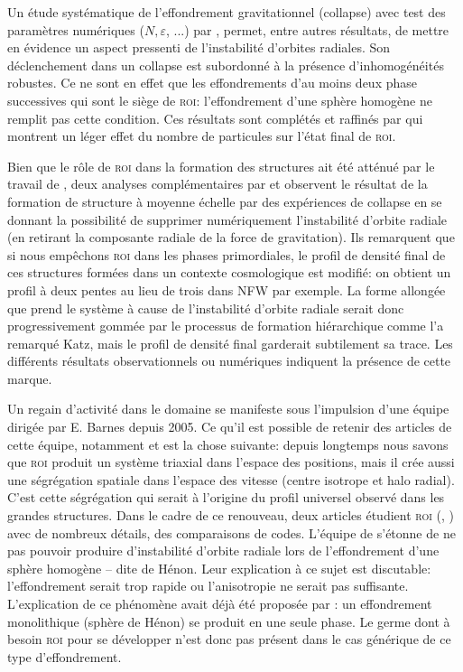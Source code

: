 Un étude systématique de l'effondrement gravitationnel (collapse) avec test des paramètres numériques ($N,\varepsilon$, ...) par
\cite{roy}, permet, entre autres résultats, de mettre en évidence un aspect pressenti de l'instabilité d'orbites radiales. Son déclenchement dans un
collapse est subordonné à la présence d'inhomogénéités robustes. Ce ne sont en effet que les effondrements d'au moins deux phase successives qui sont le
siège de \textsc{roi}: l'effondrement d'une sphère homogène ne remplit pas cette condition. Ces résultats sont complétés et raffinés par
\cite{boily} qui montrent un léger effet du nombre de particules sur l'état final de \textsc{roi}.

Bien que le rôle de \textsc{roi} dans la formation des structures ait été atténué par le travail de \cite{katz}, deux analyses
complémentaires par \cite{huss} et \cite{macmillan} observent le résultat de la formation de structure à moyenne
échelle par des expériences de collapse en se donnant la possibilité de supprimer numériquement l'instabilité d'orbite radiale (en retirant la
composante radiale de la force de gravitation). Ils remarquent que si nous empêchons \textsc{roi} dans les phases primordiales, le profil
de densité final de ces structures formées dans un contexte cosmologique est modifié: on obtient un profil à deux pentes au lieu de trois dans NFW par exemple.
La forme allongée que prend le système à cause de l'instabilité d'orbite radiale serait donc progressivement gommée par le processus de formation
hiérarchique comme l'a remarqué Katz, mais le profil de densité final garderait subtilement sa trace. Les différents résultats observationnels ou
numériques indiquent la présence de cette marque.

Un regain d'activité dans le domaine se manifeste sous l'impulsion d'une équipe dirigée par E. Barnes depuis 2005. Ce qu'il est possible de retenir des
articles de cette équipe, notamment \cite{barnes2005} et \cite{ROI_Moderne} est la chose suivante: depuis longtemps nous savons que \textsc{roi} produit
un système triaxial dans l'espace des positions, mais il crée aussi une ségrégation spatiale dans l'espace des vitesse (centre isotrope et halo
radial). C'est cette ségrégation qui serait à l'origine du profil universel observé dans les grandes structures. Dans le cadre de ce
renouveau, deux articles étudient \textsc{roi} (\cite{barneslanzel}, \cite{trenti}) avec de nombreux détails, des
comparaisons de codes. L'équipe de \cite{trenti} s'étonne de ne pas pouvoir produire d'instabilité d'orbite radiale lors de
l'effondrement d'une sphère homogène -- dite de Hénon. Leur explication à ce sujet est discutable: l'effondrement serait trop rapide ou l'anisotropie
ne serait pas suffisante. L'explication de ce phénomène avait déjà été proposée par \cite{roy}: un effondrement monolithique
(sphère de Hénon) se produit en une seule phase. Le germe dont à besoin \textsc{roi} pour se développer n'est donc pas présent dans le cas générique
de ce type d'effondrement.

